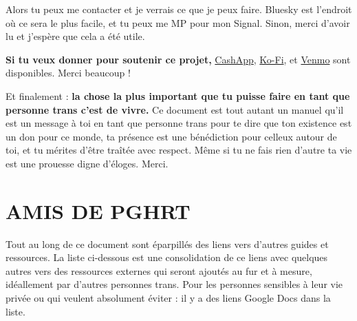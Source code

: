 \documentclass{article}
\begin{document}
Alors tu peux me contacter et je verrais ce que je peux faire. Bluesky est l'endroit où ce sera le plus facile, et tu peux me MP pour mon Signal. Sinon, merci d'avoir lu et j'espère que cela a été utile.

\textbf{Si tu veux donner pour soutenir ce projet,} \href{https://cash.app/Katitties}{CashApp}, \href{https://ko-fi.com/katitties}{Ko-Fi}, et \href{https://account.venmo.com/u/katitties}{Venmo} sont disponibles. Merci beaucoup !

Et finalement : \textbf{la chose la plus important que tu puisse faire en tant que personne trans c'est de vivre.} Ce document est tout autant un manuel qu'il est un message à toi en tant que personne trans pour te dire que ton existence est un don pour ce monde, ta présence est une bénédiction pour celleux autour de toi, et tu mérites d'être traîtée avec respect. Même si tu ne fais rien d'autre ta vie est une prouesse digne d'éloges. Merci.



\section*{AMIS DE PGHRT}\label{FOPGHRT}

Tout au long de ce document sont éparpillés des liens vers d'autres guides et ressources. La liste ci-dessous est une consolidation de ce liens avec quelques autres vers des ressources externes qui seront ajoutés au fur et à mesure, idéallement par d'autres personnes trans. Pour les personnes sensibles à leur vie privée ou qui veulent absolument éviter : il y a des liens Google Docs dans la liste.
\end{document}
